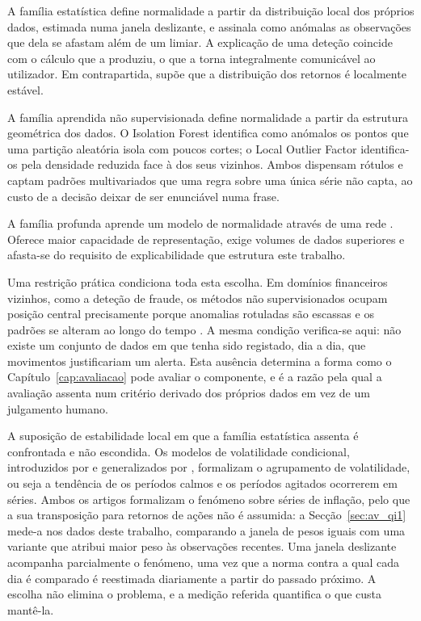 A família estatística define normalidade a partir da distribuição local dos próprios dados,
estimada numa janela deslizante, e assinala como anómalas as observações que dela se afastam além
de um limiar. A explicação de uma deteção coincide com o cálculo que a produziu, o que a torna
integralmente comunicável ao utilizador. Em contrapartida, supõe que a distribuição dos retornos é
localmente estável.

A família aprendida não supervisionada define normalidade a partir da estrutura geométrica dos
dados. O Isolation Forest \autocite{liu2008isolation} identifica como anómalos os pontos que uma
partição aleatória isola com poucos cortes; o Local Outlier Factor \autocite{breunig2000lof}
identifica-os pela densidade reduzida face à dos seus vizinhos. Ambos dispensam rótulos e captam
padrões multivariados que uma regra sobre uma única série não capta, ao custo de a decisão deixar
de ser enunciável numa frase.

A família profunda aprende um modelo de normalidade através de uma rede \autocite{pang2021deep}.
Oferece maior capacidade de representação, exige volumes de dados superiores e afasta-se do
requisito de explicabilidade que estrutura este trabalho.

Uma restrição prática condiciona toda esta escolha. Em domínios financeiros vizinhos, como a
deteção de fraude, os métodos não supervisionados ocupam posição central precisamente porque
anomalias rotuladas são escassas e os padrões se alteram ao longo do tempo
\autocite{ahmed2016financial}. A mesma condição verifica-se aqui: não existe um conjunto de dados
em que tenha sido registado, dia a dia, que movimentos justificariam um alerta. Esta ausência
determina a forma como o Capítulo~\ref{cap:avaliacao} pode avaliar o componente, e é a razão pela
qual a avaliação assenta num critério derivado dos próprios dados em vez de um julgamento humano.

A suposição de estabilidade local em que a família estatística assenta é confrontada e não
escondida. Os modelos de volatilidade condicional, introduzidos por \textcite{engle1982arch} e
generalizados por \textcite{bollerslev1986garch}, formalizam o agrupamento de volatilidade, ou seja
a tendência de os períodos calmos e os períodos agitados ocorrerem em séries. Ambos os artigos
formalizam o fenómeno sobre séries de inflação, pelo que a sua transposição para retornos de ações
não é assumida: a Secção~\ref{sec:av_qi1} mede-a nos dados deste trabalho, comparando a janela de
pesos iguais com uma variante que atribui maior peso às observações recentes. Uma janela deslizante
acompanha parcialmente o fenómeno, uma vez que a norma contra a qual cada dia é comparado é
reestimada diariamente a partir do passado próximo. A escolha não elimina o problema, e a medição
referida quantifica o que custa mantê-la.

